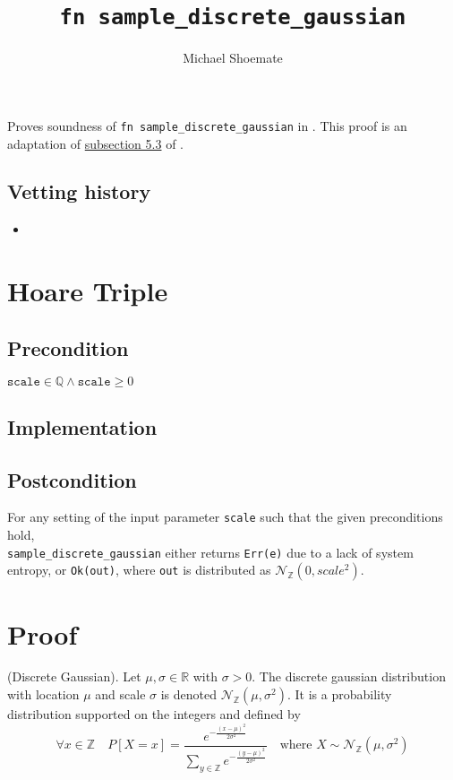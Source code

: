 \documentclass{article}
\title{\texttt{fn sample\_discrete\_gaussian}}
\author{Michael Shoemate}
\begin{document}
\maketitle

\contrib
Proves soundness of \texttt{fn sample\_discrete\_gaussian} in .
This proof is an adaptation of \href{https://arxiv.org/pdf/2004.00010.pdf#subsection.5.3}{subsection 5.3} of \cite{CKS20}.

\subsection*{Vetting history}
\begin{itemize}
    \item {}
\end{itemize}

\section{Hoare Triple}
\subsection*{Precondition}
$\texttt{scale} \in \mathbb{Q} \land \texttt{scale} \geq 0$

\subsection*{Implementation}


\subsection*{Postcondition}
\label{postcondition}
For any setting of the input parameter \texttt{scale} such that the given preconditions hold, \\
\texttt{sample\_discrete\_gaussian} either returns \texttt{Err(e)} due to a lack of system entropy,
or \texttt{Ok(out)}, where \texttt{out} is distributed as $\mathcal{N}_\mathbb{Z}(0, scale^2)$.

\section{Proof}

\begin{definition}
    (Discrete Gaussian). \cite{CKS20} Let $\mu, \sigma \in \mathbb{R}$ with $\sigma > 0$.
    The discrete gaussian distribution with location $\mu$ and scale $\sigma$ is denoted $\mathcal{N}_\mathbb{Z}(\mu, \sigma^2)$.
    It is a probability distribution supported on the integers and defined by
    \begin{equation*}
        \forall x \in \mathbb{Z} \quad  P[X = x] = \frac{e^{-\frac{(x - \mu)^2}{2\sigma^2}}}{\sum_{y\in\mathbb{Z}}e^{-\frac{(y - \mu)^2}{2\sigma^2}}} \quad \text{where } X \sim \mathcal{N}_\mathbb{Z}(\mu, \sigma^2)
    \end{equation*}
\end{definition}
\end{document}
